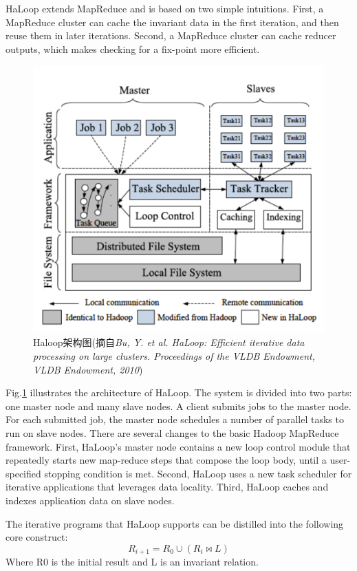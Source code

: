 HaLoop extends MapReduce and is based on two simple intuitions. First, a MapReduce cluster can cache the invariant data in the first iteration, and then reuse them in later iterations. Second, a MapReduce cluster can cache reducer outputs, which makes checking for a fix-point more efficient.

\begin{figure}[]
\centering
\includegraphics[width=5in]{../figures/haloop.pdf}
\caption{Haloop架构图(摘自\textit{Bu, Y. et al. HaLoop: Efficient iterative data processing on large clusters. Proceedings of the VLDB Endowment, VLDB Endowment, 2010})}
\label{fig:haloop}
\end{figure}

Fig.\ref{fig:haloop} illustrates the architecture of HaLoop. The system is divided into two parts: one master node and many slave nodes. A client submits jobs to the master node. For each submitted job, the master node schedules a number of parallel tasks to run on slave nodes. There are several changes to the basic Hadoop MapReduce framework. First, HaLoop's master node contains a new loop control module that repeatedly starts new map-reduce steps that compose the loop body, until a user-specified stopping condition is met. Second, HaLoop uses a new task scheduler for iterative applications that leverages data locality. Third, HaLoop caches and indexes application data on slave nodes.

The iterative programs that HaLoop supports can be distilled into the following core construct:
\begin{equation}
R_{i+1}=R_0 \cup (R_i \bowtie L)
\end{equation}
Where R0 is the initial result and L is an invariant relation.

